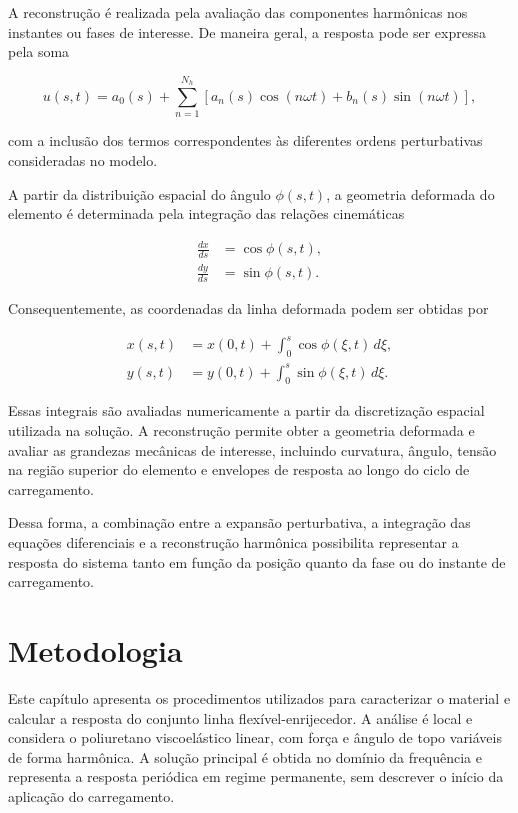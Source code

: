 \documentclass[arial,centeredequations,english,brazilian,oneside,section=TITLE]{ifes8}
\begin{document}
A reconstrução é realizada pela avaliação das componentes
harmônicas nos instantes ou fases de interesse. De maneira
geral, a resposta pode ser expressa pela soma

\begin{equation}
  u(s,t) =
  a_0(s) +
  \sum_{n=1}^{N_h}
  \left[
    a_n(s)\cos(n\omega t) +
    b_n(s)\sin(n\omega t)
  \right],
  \label{eq:reconstrucao-resposta}
\end{equation}

com a inclusão dos termos correspondentes às diferentes ordens
perturbativas consideradas no modelo.

A partir da distribuição espacial do ângulo $\phi(s,t)$, a
geometria deformada do elemento é determinada pela integração
das relações cinemáticas

\begin{align}
  \frac{dx}{ds} &= \cos\phi(s,t), \\
  \frac{dy}{ds} &= \sin\phi(s,t).
\end{align}

Consequentemente, as coordenadas da linha deformada podem ser
obtidas por

\begin{align}
  x(s,t) &=
  x(0,t)+
  \int_0^s \cos\phi(\xi,t)\,d\xi, \\
  y(s,t) &=
  y(0,t)+
  \int_0^s \sin\phi(\xi,t)\,d\xi.
\end{align}

Essas integrais são avaliadas numericamente a partir da
discretização espacial utilizada na solução. A reconstrução
permite obter a geometria deformada e avaliar as grandezas
mecânicas de interesse, incluindo curvatura, ângulo, tensão
na região superior do elemento e envelopes de resposta ao
longo do ciclo de carregamento.

Dessa forma, a combinação entre a expansão perturbativa, a
integração das equações diferenciais e a reconstrução
harmônica possibilita representar a resposta do sistema tanto
em função da posição quanto da fase ou do instante de
carregamento.

\chapter{Metodologia}
\label{sec:metodologia}

Este capítulo apresenta os procedimentos utilizados para caracterizar o material e calcular a
resposta do conjunto linha flexível-enrijecedor. A análise é local e considera o poliuretano
viscoelástico linear, com força e ângulo de topo variáveis de forma harmônica. A solução principal
é obtida no domínio da frequência e representa a resposta periódica em regime permanente,
sem descrever o início da aplicação do carregamento.
\end{document}
